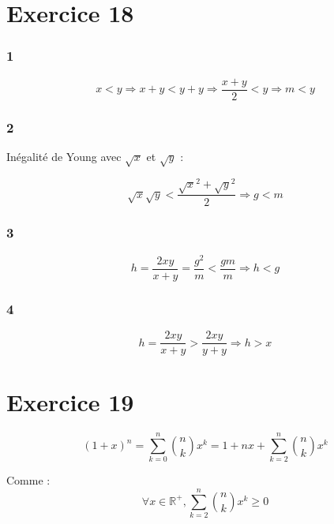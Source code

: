 \documentclass{report}
\begin{document}
\section*{Exercice 18}

\subsubsection*{1}

\begin{displaymath}
	x < y \Rightarrow x + y < y + y \Rightarrow \frac{x+y}{2} < y \Rightarrow m <y
\end{displaymath}

\subsubsection*{2}

Inégalité de Young avec $\sqrt{x}$ et $\sqrt{y}$ :

\begin{displaymath}
	\sqrt{x} \sqrt{y} < \frac{\sqrt{x}^2 + \sqrt{y}^2}{2} \Rightarrow g<m
\end{displaymath}

\subsubsection*{3}

\begin{displaymath}
	h = \frac{2xy}{x+y} = \frac{g^2}{m} < \frac{gm}{m} \Rightarrow h < g
\end{displaymath}

\subsubsection*{4}

\begin{displaymath}
	h = \frac{2xy}{x+y} > \frac{2xy}{y+y} \Rightarrow h > x
\end{displaymath}

\section*{Exercice 19}
\begin{displaymath}
	(1+x)^n = \sum_{k=0}^{n}\binom{n}{k}x^k = 1 + nx + \sum_{k=2}^{n}\binom{n}{k}x^k
\end{displaymath}

Comme :
\begin{displaymath}
	\forall x \in \mathbb{R}^{+},  \sum_{k=2}^{n}\binom{n}{k}x^k \geq 0
\end{displaymath}
\end{document}
